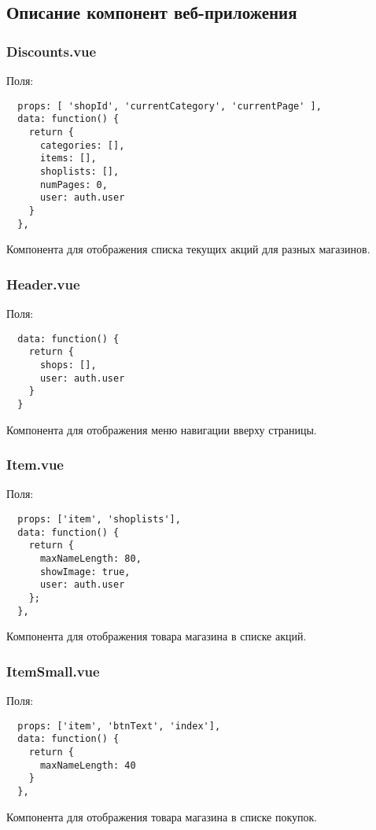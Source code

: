 
\subsection{Описание компонент веб-приложения}

\subsubsection{Discounts.vue}
Поля:
\begin{verbatim}
  props: [ 'shopId', 'currentCategory', 'currentPage' ],
  data: function() {
    return {
      categories: [],
      items: [],
      shoplists: [],
      numPages: 0,
      user: auth.user
    }
  },
\end{verbatim}
Компонента для отображения списка текущих акций для разных магазинов.

\subsubsection{Header.vue}
Поля:
\begin{verbatim}
  data: function() {
    return {
      shops: [],
      user: auth.user
    }
  }
\end{verbatim}
Компонента для отображения меню навигации вверху страницы.

\subsubsection{Item.vue}
Поля:
\begin{verbatim}
  props: ['item', 'shoplists'],
  data: function() {
    return {
      maxNameLength: 80,
      showImage: true,
      user: auth.user
    };
  },
\end{verbatim}
Компонента для отображения товара магазина в списке акций.

\subsubsection{ItemSmall.vue}
Поля:
\begin{verbatim}
  props: ['item', 'btnText', 'index'],
  data: function() {
    return {
      maxNameLength: 40
    }
  }, 
\end{verbatim}
Компонента для отображения товара магазина в списке покупок.

